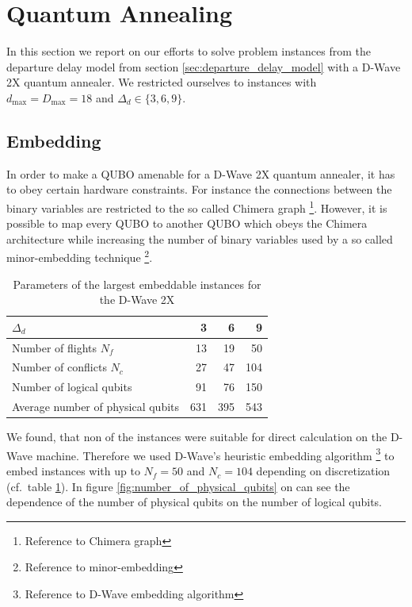\section{Quantum Annealing}
In this section we report on our efforts to solve problem instances from the departure delay model from section \ref{sec:departure_delay_model} with a D-Wave 2X quantum annealer.
We restricted ourselves to instances with $d_\text{max}=D_\text{max}=18$ and $\Delta_d \in \{3, 6, 9\}$.
\subsection{Embedding}
In order to make a QUBO amenable for a D-Wave 2X quantum annealer, it has to obey certain hardware constraints.
For instance the connections between the binary variables are restricted to the so called Chimera graph \footnote{Reference to Chimera graph}.
However, it is possible to map every QUBO to another QUBO which obeys the Chimera architecture while increasing the number of binary variables used by a so called minor-embedding technique \footnote{Reference to minor-embedding}. 

\begin{table}[htpb]
    \begin{tabular}{lrrr}
    \toprule
    $\Delta_d$ &    3 &    6 &    9 \\
    \midrule
    Number of flights $N_f$   &   13 &   19 &   50 \\
    Number of conflicts $N_c$ &   27 &   47 &  104 \\
    Number of logical qubits  &   91 &   76 &  150 \\
    Average number of physical qubits &  631 &  395 &  543 \\
    \bottomrule
    \end{tabular}
    \caption{Parameters of the largest embeddable instances for the D-Wave 2X}
    \label{tab:embedding}
\end{table}

We found, that non of the instances were suitable for direct calculation on the D-Wave machine.
Therefore we used D-Wave's heuristic embedding algorithm \footnote{Reference to D-Wave embedding algorithm} to embed instances with up to $N_f=50$ and $N_c=104$ depending on discretization (cf.\ table \ref{tab:embedding}).
In figure \ref{fig:number_of_physical_qubits} on can see the dependence of the number of physical qubits on the number of logical qubits.


